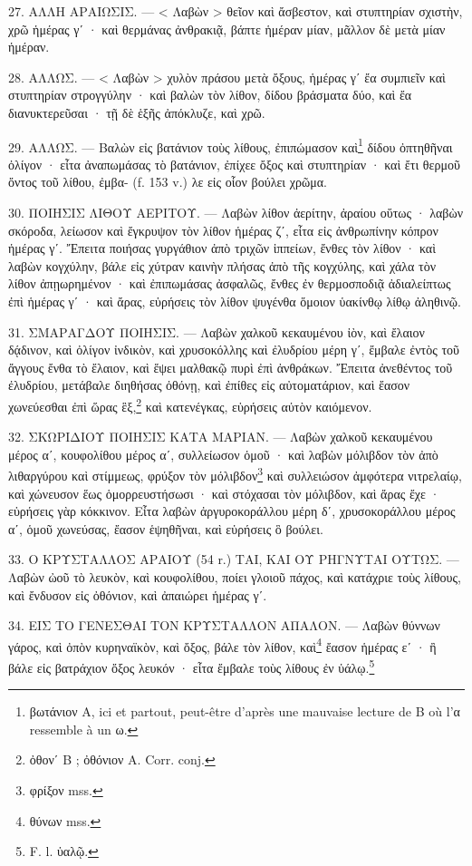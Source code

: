 \documentclass[a4paper, 11pt, oneside, polutonikogreek, french]{article}
\begin{document}
27. ΑΛΛΗ ΑΡΑΙΩΣΙΣ. --- < Λαβὼν > θεῖον καὶ ἄσβεστον, καὶ στυπτηρίαν σχιστὴν, χρῶ ἡμέρας γʹ · καὶ θερμάνας ἀνθρακιᾷ, βάπτε ἡμέραν μίαν, μᾶλλον δὲ μετὰ μίαν ἡμέραν.

28. ΑΛΛΩΣ. --- < Λαβὼν > χυλὸν πράσου μετὰ ὄξους, ἡμέρας γʹ ἔα συμπιεῖν καὶ στυπτηρίαν στρογγύλην · καὶ βαλὼν τὸν λίθον, δίδου βράσματα δύο, καὶ ἔα διανυκτερεῦσαι · τῇ δὲ ἑξῆς ἀπόκλυζε, καὶ χρῶ.

29. ΑΛΛΩΣ. --- Βαλὼν εἰς βατάνιον τοὺς λίθους, ἐπιπώμασον καὶ\footnote{βωτάνιον A, ici et partout, peut-être d'après une mauvaise lecture de B où l'α ressemble à un ω.} δίδου ὀπτηθῆναι ὀλίγον · εἶτα ἀναπωμάσας τὸ βατάνιον, ἐπίχεε ὄξος καὶ στυπτηρίαν · καὶ ἔτι θερμοῦ ὄντος τοῦ λίθου, ἐμβα- (f. 153 v.) λε εἰς οἷον βούλει χρῶμα.

30. ΠΟΙΗΣΙΣ ΛΙΘΟΥ ΑΕΡΙΤΟΥ. --- Λαβὼν λίθον ἀερίτην, ἀραίου οὕτως · λαβὼν σκόροδα, λείωσον καὶ ἔγκρυψον τὸν λίθον ἡμέρας ζʹ, εἶτα εἰς ἀνθρωπίνην κόπρον ἡμέρας γʹ. Ἔπειτα ποιήσας γυργάθιον ἀπὸ τριχῶν ἱππείων, ἔνθες τὸν λίθον · καὶ λαβὼν κογχύλην, βάλε εἰς χύτραν καινὴν πλήσας ἀπὸ τῆς κογχύλης, καὶ χάλα τὸν λίθον ἀπῃωρημένον · καὶ ἐπιπωμάσας ἀσφαλῶς, ἔνθες ἐν θερμοσποδιᾷ ἀδιαλείπτως ἐπὶ ἡμέρας γʹ · καὶ ἄρας, εὑρήσεις τὸν λίθον ψυγένθα ὅμοιον ὑακίνθῳ λίθῳ ἀληθινῷ.

31. ΣΜΑΡΑΓΔΟΥ ΠΟΙΗΣΙΣ. --- Λαβὼν χαλκοῦ κεκαυμένου ἰὸν, καὶ ἔλαιον δᾴδινον, καὶ ὀλίγον ἰνδικὸν, καὶ χρυσοκόλλης καὶ ἐλυδρίου μέρη γʹ, ἔμβαλε ἐντὸς τοῦ ἄγγους ἔνθα τὸ ἔλαιον, καὶ ἕψει μαλθακῷ πυρὶ ἐπὶ ἀνθράκων. Ἔπειτα ἀνεθέντος τοῦ ἐλυδρίου, μετάβαλε διηθήσας ὀθόνῃ, καὶ ἐπίθες εἰς αὐτοματάριον, καὶ ἔασον χωνεύεσθαι ἐπὶ ὥρας ἓξ,\footnote{ὀθονʹ B ; ὀθόνιον A. Corr. conj.} καὶ κατενέγκας, εὑρήσεις αὐτὸν καιόμενον.

32. ΣΚΩΡΙΔΙΟΥ ΠΟΙΗΣΙΣ ΚΑΤΑ ΜΑΡΙΑΝ. --- Λαβὼν χαλκοῦ κεκαυμένου μέρος αʹ, κουφολίθου μέρος αʹ, συλλείωσον ὁμοῦ · καὶ λαβὼν μόλιβδον τὸν ἀπὸ λιθαργύρου καὶ στίμμεως, φρύξον τὸν μόλιβδον\footnote{φρίξον mss.} καὶ συλλειώσον ἀμφότερα νιτρελαίῳ, καὶ χώνευσον ἕως ὁμορρευστήσωσι · καὶ στόχασαι τὸν μόλιβδον, καὶ ἄρας ἔχε · εὑρήσεις γὰρ κόκκινον. Εἶτα λαβὼν ἀργυροκοράλλου μέρη δʹ, χρυσοκοράλλου μέρος αʹ, ὁμοῦ χωνεύσας, ἔασον ἑψηθῆναι, καὶ εὑρήσεις ὃ βούλει.

33. Ο ΚΡΥΣΤΑΛΛΟΣ ΑΡΑΙΟΥ (54 r.) ΤΑΙ, ΚΑΙ ΟΥ ΡΗΓΝΥΤΑΙ ΟΥΤΩΣ. --- Λαβὼν ὠοῦ τὸ λευκὸν, καὶ κουφολίθου, ποίει γλοιοῦ πάχος, καὶ κατάχριε τοὺς λίθους, καὶ ἔνδυσον εἰς ὀθόνιον, καὶ ἀπαιώρει ἡμέρας γʹ.

34. ΕΙΣ ΤΟ ΓΕΝΕΣΘΑΙ ΤΟΝ ΚΡΥΣΤΑΛΛΟΝ ΑΠΑΛΟΝ. --- Λαβὼν θύννων γάρος, καὶ ὀπὸν κυρηναϊκὸν, καὶ ὄξος, βάλε τὸν λίθον, καὶ\footnote{θύνων mss.} ἔασον ἡμέρας εʹ · ἢ βάλε εἰς βατράχιον ὄξος λευκόν · εἶτα ἔμβαλε τοὺς λίθους ἐν ὑάλῳ.\footnote{F. l. ὑαλῷ.}
\end{document}
